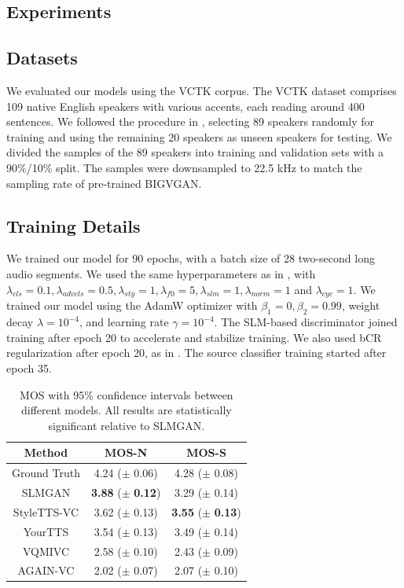 \documentclass{article}
\begin{document}
\begin{sloppy}
\section{Experiments}
\label{sec:experiments}

\subsection{Datasets} We evaluated our models using the VCTK \cite{yamagishi2019cstr} corpus. The VCTK dataset comprises 109 native English speakers with various accents, each reading around 400 sentences. We followed the procedure in \cite{wang2021vqmivc, li2023styletts}, selecting 89 speakers randomly for training and using the remaining 20 speakers as unseen speakers for testing. We  divided the samples of the 89 speakers into training and validation sets with a 90\%/10\% split. The samples were downsampled to 22.5 kHz to match the sampling rate of pre-trained BIGVGAN.

\subsection{Training Details} We trained our model for 90 epochs, with a batch size of 28 two-second long audio segments. We used the same hyperparameters as in \cite{li2021starganv2}, with $\lambda_{cls} = 0.1, \lambda_{advcls} = 0.5, \lambda_{sty} = 1, \lambda_{f0} = 5, \lambda_{slm} = 1, \lambda_{norm} = 1$ and $ \lambda_{cyc} = 1$. We trained our model using the AdamW optimizer \cite{loshchilov2018fixing} with $\beta_1 = 0, \beta_2 = 0.99$, weight decay $\lambda = 10^{-4}$, and learning rate $\gamma = 10^{-4}$. The SLM-based discriminator joined training after epoch 20 to accelerate and stabilize training. We also used bCR regularization \cite{zhao2021improved} after epoch 20, as in \cite{li2021starganv2}. The source classifier training started after epoch 35.


\begin{table}[!t]
\vspace{-0.2cm} 

	\centering
	\caption{MOS with 95\% confidence intervals between different models. All results are statistically significant relative to SLMGAN.  \\ } 
    \begin{tabular}{c|c|c}
    \hline
    Method & MOS-N & MOS-S \\
    \hline
    Ground Truth      & 4.24 ($\pm$ 0.06)  & 4.28 ($\pm$ 0.08) \\
    \hline
    SLMGAN   & \textbf{3.88} ($\pm$ \textbf{0.12})  &    {3.29} ($\pm$ {0.14}) \\
    StyleTTS-VC   & {3.62} ($\pm$ {0.13})  &    \textbf{3.55} ($\pm$ \textbf{0.13}) \\
    YourTTS & 3.54 ($\pm$ 0.13) & 3.49 ($\pm$ 0.14) \\
    VQMIVC  & 2.58 ($\pm$ 0.10) & 2.43 ($\pm$ 0.09) \\
    AGAIN-VC & 2.02 ($\pm$ 0.07)  & 2.07 ($\pm$ 0.10) \\
    \hline
    \end{tabular}
    \label{tab:t1}
\vspace{-0.2cm} 


\end{table}
\end{sloppy}
\end{document}
